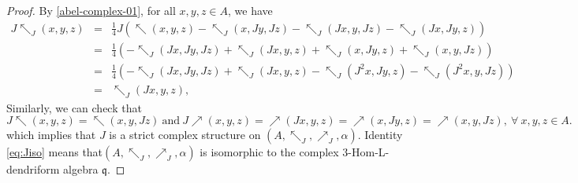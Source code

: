 \documentclass[a4paper,11pt]{article}
\def\nw{\nwarrow}
\def\ne{\nearrow}
\theoremstyle{definition}
\begin{document}
\begin{proof}
By \eqref{abel-complex-01}, for all $x,y,z\in A$, we have
\begin{eqnarray*}
J\nw_J(x,y,z)&=&\frac{1}{4}J(\nw(x,y,z)-\nw_J(x,Jy,Jz)-\nw_J(Jx,y,Jz)-\nw_J(Jx,Jy,z))\\
          &=&\frac{1}{4}(-\nw_J(Jx,Jy,Jz)+\nw_J(Jx,y,z)+\nw_J(x,Jy,z)+\nw_J(x,y,Jz))\\&=&\frac{1}{4}(-\nw_J(Jx,Jy,Jz)+\nw_J(Jx,y,z)-\nw_J(J^2x,Jy,z)-\nw_J(J^2x,y,Jz))\\
          &=&\nw_J(Jx,y,z),
\end{eqnarray*} Similarly, we can check that $$J\nw(x,y,z)=\nw(x,y,Jz)\ \textrm{and}\   J\ne(x,y,z)=\ne(Jx,y,z)=\ne(x,Jy,z)=\ne(x,y,Jz),\ \forall \ x,y,z\in A.$$
which implies that $J$ is a strict complex structure on  $(A,\nw_J,\ne_J,\alpha)$.
Identity \eqref{eq:Jiso} means that$(A,\nw_J,\ne_J,\alpha)$  is isomorphic to the complex $3$-Hom-L-dendriform algebra $\mathfrak{q}$.

\end{proof}
\end{document}
